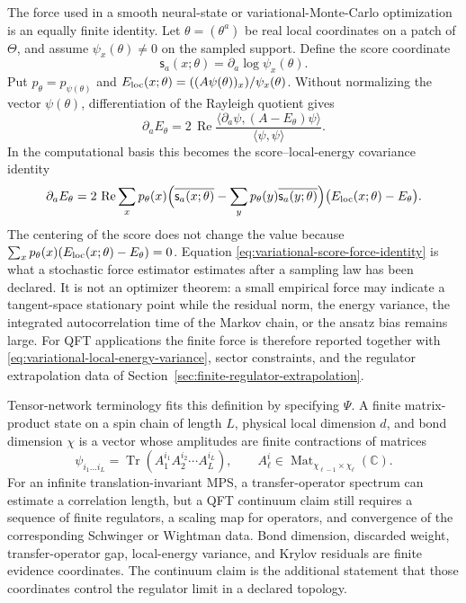 The force used in a smooth neural-state or variational-Monte-Carlo
optimization is an equally finite identity.  Let
\(\theta=(\theta^a)\) be real local coordinates on a patch of \(\Theta\), and
assume \(\psi_x(\theta)\neq0\) on the sampled support.  Define the score
coordinate
\[
  \mathsf s_a(x;\theta)=\partial_a\log\psi_x(\theta).
\]
Put \(p_\theta=p_{\psi(\theta)}\) and
\(E_{\rm loc}(x;\theta)=((A\psi(\theta))_x)/\psi_x(\theta)\).
Without normalizing the vector \(\psi(\theta)\), differentiation of the
Rayleigh quotient gives
\[
  \partial_a E_\theta
  =
  2\,\operatorname{Re}
  \frac{\langle \partial_a\psi,(A-E_\theta)\psi\rangle}
       {\langle\psi,\psi\rangle}.
\]
In the computational basis this becomes the score--local-energy covariance
identity
\begin{equation}
  \partial_a E_\theta
  =
  2\,\operatorname{Re}
  \sum_x p_\theta(x)
  \Bigl(
    \overline{\mathsf s_a(x;\theta)}
    -
    \sum_y p_\theta(y)\overline{\mathsf s_a(y;\theta)}
  \Bigr)
  \bigl(E_{\rm loc}(x;\theta)-E_\theta\bigr).
  \label{eq:variational-score-force-identity}
\end{equation}
The centering of the score does not change the value because
\(\sum_xp_\theta(x)(E_{\rm loc}(x;\theta)-E_\theta)=0\).  Equation
\eqref{eq:variational-score-force-identity} is what a stochastic force
estimator estimates after a sampling law has been declared.  It is not an
optimizer theorem: a small empirical force may indicate a tangent-space
stationary point while the residual norm, the energy variance, the integrated
autocorrelation time of the Markov chain, or the ansatz bias remains large.
For QFT applications the finite force is therefore reported together with
\eqref{eq:variational-local-energy-variance}, sector constraints, and the
regulator extrapolation data of
Section~\ref{sec:finite-regulator-extrapolation}.

Tensor-network terminology fits this definition by specifying \(\Psi\).  A
finite matrix-product state on a spin chain of length \(L\), physical local
dimension \(d\), and bond dimension \(\chi\) is a vector whose amplitudes
are finite contractions of matrices
\[
  \psi_{i_1\ldots i_L}
  =
  \operatorname{Tr}\!\left(
    A^{i_1}_1A^{i_2}_2\cdots A^{i_L}_L
  \right),
  \qquad
  A^i_\ell\in\operatorname{Mat}_{\chi_{\ell-1}\times\chi_\ell}(\mathbb C).
\]
For an infinite translation-invariant MPS, a transfer-operator spectrum can
estimate a correlation length, but a QFT continuum claim still requires a
sequence of finite regulators, a scaling map for operators, and convergence
of the corresponding Schwinger or Wightman data.  Bond dimension, discarded
weight, transfer-operator gap, local-energy variance, and Krylov residuals
are finite evidence coordinates.  The continuum claim is the additional
statement that those coordinates control the regulator limit in a declared
topology.

